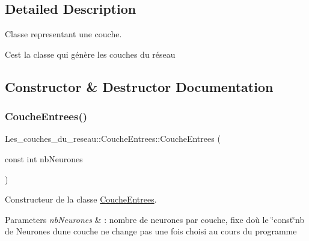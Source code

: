 \subsection{Detailed Description}
Classe representant une couche. 

C\textquotesingle{}est la classe qui génère les couches du réseau 

\subsection{Constructor \& Destructor Documentation}
\mbox{\label{class_les__couches__du__reseau_1_1_couche_entrees_a880aff72f6d9dfa97a8f38aed085e28b}} 
\subsubsection{\texorpdfstring{Couche\+Entrees()}{CoucheEntrees()}}
{\footnotesize\ttfamily Les\+\_\+couches\+\_\+du\+\_\+reseau\+::\+Couche\+Entrees\+::\+Couche\+Entrees (\begin{DoxyParamCaption}\item[{const int}]{nb\+Neurones }\end{DoxyParamCaption})}



Constructeur de la classe \hyperlink{class_les__couches__du__reseau_1_1_couche_entrees}{Couche\+Entrees}. 


\begin{DoxyParams}{Parameters}
{\em nb\+Neurones} & \+: nombre de neurones par couche, fixe d\textquotesingle{}où le \char`\"{}const\char`\"{}nb de Neurones d\textquotesingle{}une couche ne change pas une fois choisi au cours du programme \\
\hline
\end{DoxyParams}
\mbox{\label{class_les__couches__du__reseau_1_1_couche_entrees_ac672754ca6746650c139d3b22d5c611c}} 
